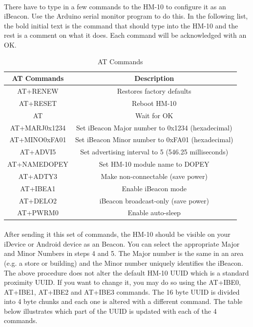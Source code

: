 \documentclass[a4paper,12pt]{report}
\begin{document}
\paragraph{}There have to type in a few commands to the HM-10 to configure it as an iBeacon. Use the Arduino serial monitor program to do this. In the following list, the bold initial text is the command that should type into the HM-10 and the rest is a comment on what it does. Each command will be acknowledged with an OK.
\begin{table}[!h]
	\centering
	\caption{AT Commands}
	\label{table3}
	\begin{tabular}{|c|c|}
		\hline
		\textbf{AT Commands} & \textbf{Description}\\
		\hline
		AT+RENEW & Restores factory defaults\\
		\hline
		AT+RESET & Reboot HM-10\\
		\hline
		AT & Wait for OK\\
		\hline
		AT+MARJ0x1234 &	Set iBeacon Major number to 0x1234 (hexadecimal)\\
		\hline
		AT+MINO0xFA01 &	Set iBeacon Minor number to 0xFA01 (hexadecimal)\\
		\hline
		AT+ADVI5 & Set advertising interval to 5 (546.25 milliseconds)\\
		\hline
		AT+NAMEDOPEY & Set HM-10 module name to DOPEY\\
		\hline
		AT+ADTY3 & Make non-connectable (save power)\\
		\hline
		AT+IBEA1 & Enable iBeacon mode \\
		\hline
		AT+DELO2 & iBeacon broadcast-only (save power)\\
		\hline
		AT+PWRM0 & Enable auto-sleep\\
		\hline
	\end{tabular}
\end{table}
\paragraph{}After sending it this set of commands, the HM-10 should be visible on your iDevice or Android device as an Beacon. You can select the appropriate Major and Minor Numbers in steps 4 and 5. The Major number is the same in an area (e.g. a store or building) and the Minor number uniquely identifies the iBeacon. The above procedure does not alter the default HM-10 UUID which is a standard proximity UUID. If you want to change it, you may do so using the AT+IBE0, AT+IBE1, AT+IBE2 and AT+IBE3 commands. The 16 byte UUID is divided into 4 byte chunks and each one is altered with a different command. The table below illustrates which part of the UUID is updated with each of the 4 commands.
\end{document}
